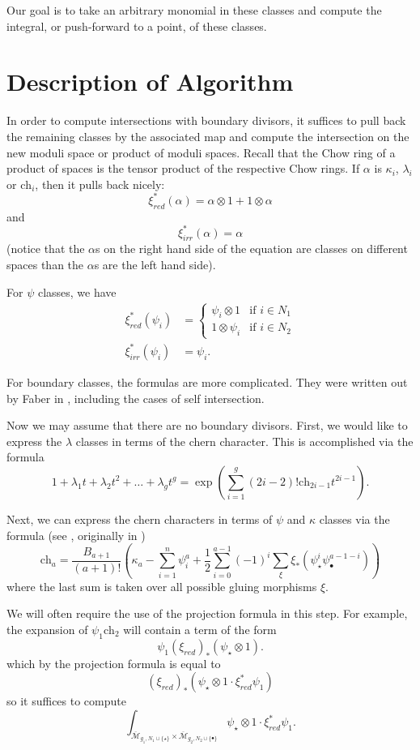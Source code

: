 \documentclass{amsart}
\newcommand{\M}[2]{\overline{\mathcal M}_{{#1},{#2}}}
\newcommand{\ch}{\text{ch}}
\begin{document}
Our goal is to take an arbitrary monomial in these classes and compute the integral, or push-forward to a point, of these classes.

\section{Description of Algorithm}
  In order to compute intersections with boundary divisors, it suffices to pull back the remaining classes by the associated map and compute the intersection on the new moduli space or product of moduli spaces.  Recall that the Chow ring of a product of spaces is the tensor product of the respective Chow rings.  If $\alpha$ is $\kappa_i$, $\lambda_i$ or $\ch_i$, then it pulls back nicely:
\[
	\xi_{red}^*(\alpha) = \alpha \otimes 1 + 1 \otimes \alpha
\]
and
\[
	\xi_{irr}^*(\alpha) = \alpha
\]
(notice that the $\alpha$s on the right hand side of the equation are classes on different spaces than the $\alpha$s are the left hand side).

For $\psi$ classes, we have
\begin{align*}
	\xi_{red}^{*}(\psi_i) &= \begin{cases} \psi_i \otimes 1 & \text{if } i \in N_1 \\
																				1 \otimes \psi_i & \text{if } i \in N_2 \end{cases} \\
	\xi_{irr}^*(\psi_i) &= \psi_i.																				
\end{align*}

For boundary classes, the formulas are more complicated.  They were written out by Faber in \cite{faber}, including the cases of self intersection.

Now we may assume that there are no boundary divisors.  First, we would like to express the $\lambda$ classes in terms of the chern character.  This is accomplished via the formula
\[
 1 + \lambda_1 t + \lambda_2 t^2 + \dots + \lambda_g t^g = \exp \left(\sum_{i = 1}^g (2i-2)!\ch_{2i-1}t^{2i-1}\right).
\]

Next, we can express the chern characters in terms of $\psi$ and $\kappa$ classes via the formula (see \cite{yang}, originally in \cite{mumford})
\[
 \ch_a = \frac{B_{a+1}}{(a+1)!} \left( \kappa_a - \sum_{i = 1}^n \psi_i^a + \frac12 \sum_{i=0}^{a-1} (-1)^i\sum_{\xi} \xi_* (\psi_{\star}^i  \psi_{\bullet}^{a-1-i}) \right)
\]
where the last sum is taken over all possible gluing morphisms $\xi$.

We will often require the use of the projection formula in this step.  For example, the expansion of $\psi_1 \ch_2$ will contain a term of the form
\[
	\psi_1 (\xi_{red})_* (\psi_{\star} \otimes 1).
\]
which by the projection formula is equal to
\[
	(\xi_{red})_*( \psi_\star \otimes 1 \cdot \xi_{red}^*\psi_1)
\]
so it suffices to compute
\[
\int_{\M{g_1}{N_1 \cup \{\star\}} \times \M{g_2}{N_2 \cup \{\bullet\}}}  \psi_\star \otimes 1 \cdot \xi_{red}^*\psi_1.
\]
\end{document}
